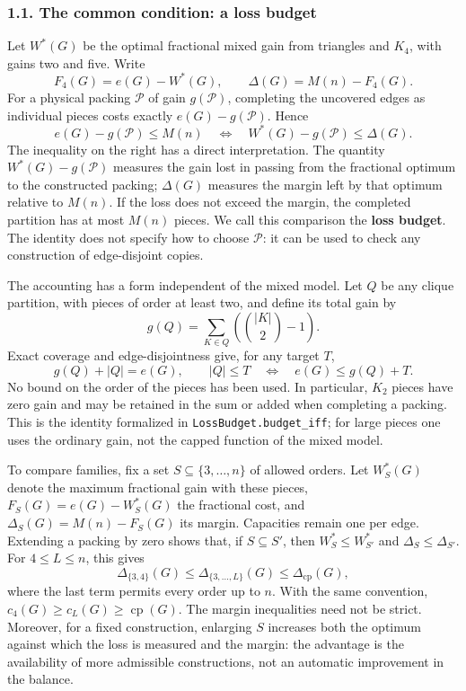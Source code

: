 \documentclass[english,11pt,a4paper]{article}
\begin{document}
\subsubsection{1.1. The common condition: a loss budget}\label{the-common-condition-a-loss-budget}

Let \(W^*(G)\) be the optimal fractional mixed gain from triangles and \(K_4\), with gains two and five. Write \[
F_4(G)=e(G)-W^*(G),\qquad \Delta(G)=M(n)-F_4(G).
\] For a physical packing \(\mathcal P\) of gain \(g(\mathcal P)\), completing the uncovered edges as individual pieces costs exactly \(e(G)-g(\mathcal P)\). Hence \[
\boxed{
e(G)-g(\mathcal P)\le M(n)
\quad\Longleftrightarrow\quad
W^*(G)-g(\mathcal P)\le\Delta(G).
}
\tag{1.3}
\] The inequality on the right has a direct interpretation. The quantity \(W^*(G)-g(\mathcal P)\) measures the gain lost in passing from the fractional optimum to the constructed packing; \(\Delta(G)\) measures the margin left by that optimum relative to \(M(n)\). If the loss does not exceed the margin, the completed partition has at most \(M(n)\) pieces. We call this comparison the \textbf{loss budget}. The identity does not specify how to choose \(\mathcal P\): it can be used to check any construction of edge-disjoint copies.

The accounting has a form independent of the mixed model. Let \(Q\) be any clique partition, with pieces of order at least two, and define its total gain by \[
g(Q)=\sum_{K\in Q}\left(\binom{|K|}{2}-1\right).
\] Exact coverage and edge-disjointness give, for any target \(T\), \[
g(Q)+|Q|=e(G),\qquad
|Q|\le T\quad\Longleftrightarrow\quad e(G)\le g(Q)+T.
\tag{1.3a}
\] No bound on the order of the pieces has been used. In particular, \(K_2\) pieces have zero gain and may be retained in the sum or added when completing a packing. This is the identity formalized in \nolinkurl{LossBudget.budget_iff}; for large pieces one uses the ordinary gain, not the capped function of the mixed model.

To compare families, fix a set \(S\subseteq\{3,\ldots,n\}\) of allowed orders. Let \(W_S^*(G)\) denote the maximum fractional gain with these pieces, \(F_S(G)=e(G)-W_S^*(G)\) the fractional cost, and \(\Delta_S(G)=M(n)-F_S(G)\) its margin. Capacities remain one per edge. Extending a packing by zero shows that, if \(S\subseteq S'\), then \(W_S^*\le W_{S'}^*\) and \(\Delta_S\le\Delta_{S'}\). For \(4\le L\le n\), this gives \[
\Delta_{\{3,4\}}(G)\le\Delta_{\{3,\ldots,L\}}(G)
\le\Delta_{\mathrm{cp}}(G),
\tag{1.3b}
\] where the last term permits every order up to \(n\). With the same convention, \(c_4(G)\ge c_L(G)\ge\operatorname{cp}(G)\). The margin inequalities need not be strict. Moreover, for a fixed construction, enlarging \(S\) increases both the optimum against which the loss is measured and the margin: the advantage is the availability of more admissible constructions, not an automatic improvement in the balance.
\end{document}
